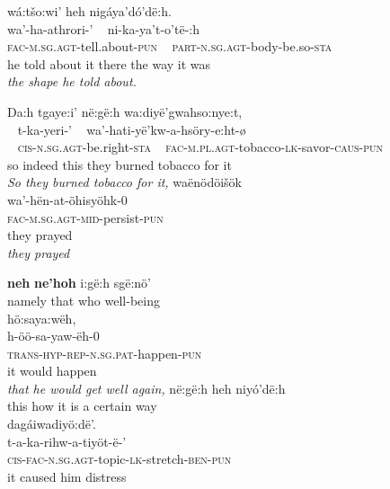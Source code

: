 \ex
\gllll wá:tšo:wi’             heh    nigáya’dó’dë:h.\\
      wa’-ha-athrori-’        ~       ni-ka-ya’t-o’të-:h\\
\textsc{fac-m.sg.agt}{}-tell.about-\textsc{pun}   ~    \textsc{part-n.sg.agt}{}-body-be.so-\textsc{sta}\\
{he told about it}           {there}  {the way it was}\\

\textit{the shape he told about.}

\ex
\gllll Da:h  tgaye:i’            në:gë:h  wa:diyë’gwahso:nye:t,\\
       ~     t-ka-yeri-’         ~   wa’-hati-yë’kw-a-hsöry-e:ht-ø\\
       ~ \textsc{cis-n.sg.agt}{}-be.right-\textsc{sta}   ~    \textsc{fac-m.pl.agt}{}-tobacco-\textsc{lk}{}-savor-\textsc{caus-pun}\\
{so}     indeed             this   {they burned tobacco for it}\\

\textit{So they burned tobacco for it,}
\ex
\gllll waënödöišök\\
wa’-hën-at-öhisyöhk-0\\
\textsc{fac-m.sg.agt}{}-\textsc{mid}{}-persist-\textsc{pun}\\
{they prayed}\\

\textit{they prayed}

\ex
\gll \textbf{neh}      \textbf{ne’hoh} i:gë:h    sgë:nö’   \\    
       namely          that                who   well-being\\ 
 \gllll  hö:saya:wëh,\\
 h-öö-sa-yaw-ëh-0\\
 \textsc{trans-hyp-rep-n.sg.pat}{}-happen-\textsc{pun}\\
 {it would happen}\\

\textit{that he would get well again,}
\ex
\gll në:gë:h  heh    niyó’dë:h      \\   
this     how   {it is a certain way}\\
\gllll dagáiwadiyö:dë’.\\
  t-a-ka-rihw-a-tiyöt-ë-’\\
\textsc{cis-fac-n.sg.agt}{}-topic-\textsc{lk}{}-stretch-\textsc{ben}{}-\textsc{pun}\\
{it caused him distress}\\

